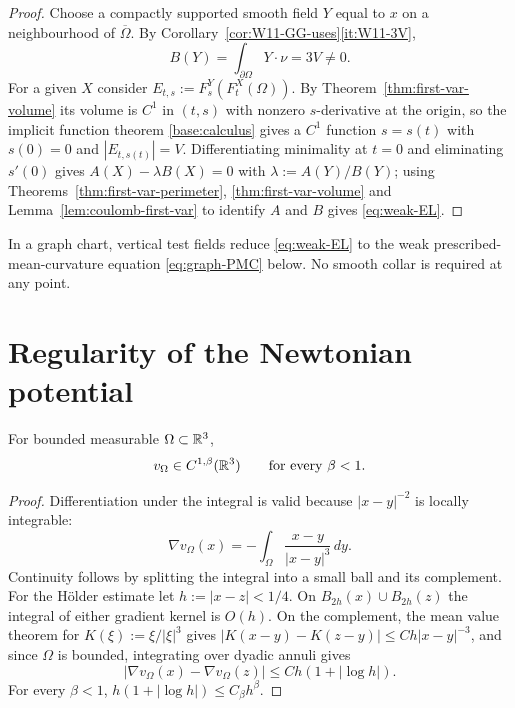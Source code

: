\begin{proof}
Choose a compactly supported smooth field $Y$ equal to $x$ on a neighbourhood
of $\overline\Omega$.  By
Corollary~\ref{cor:W11-GG-uses}\ref{it:W11-3V},
\begin{equation}\label{eq:BY}
  B(Y)=\int_{\partial\Omega}Y\cdot\nu=3V\ne0 .
\end{equation}
For a given $X$ consider $E_{t,s}:=F^Y_s(F^X_t(\Omega))$.  By
Theorem~\ref{thm:first-var-volume} its volume is $C^1$ in $(t,s)$ with nonzero
$s$-derivative at the origin, so the implicit function theorem
\ref{base:calculus} gives a $C^1$ function $s=s(t)$ with $s(0)=0$ and
$|E_{t,s(t)}|=V$.  Differentiating minimality at $t=0$ and eliminating
$s'(0)$ gives $A(X)-\lambda B(X)=0$ with $\lambda:=A(Y)/B(Y)$; using
Theorems~\ref{thm:first-var-perimeter}, \ref{thm:first-var-volume} and
Lemma~\ref{lem:coulomb-first-var} to identify $A$ and $B$ gives
\eqref{eq:weak-EL}.
\end{proof}

\begin{remark}\label{rem:no-collar}
In a graph chart, vertical test fields reduce \eqref{eq:weak-EL} to the weak
prescribed-mean-curvature equation \eqref{eq:graph-PMC} below.  No smooth
collar is required at any point.
\end{remark}

\section{Regularity of the Newtonian potential}

\begin{lemma}\label{lem:potential-C1beta}
For bounded measurable $\Omega\subset\mathbb R^3$,
\begin{equation}\label{eq:potential-C1beta}
  v_\Omega\in C^{1,\beta}(\mathbb R^3)\qquad\text{for every }\beta<1 .
\end{equation}
\end{lemma}

\begin{proof}
Differentiation under the integral is valid because $|x-y|^{-2}$ is locally
integrable:
\[
  \nabla v_\Omega(x)=-\int_\Omega\frac{x-y}{|x-y|^3}\,dy .
\]
Continuity follows by splitting the integral into a small ball and its
complement.  For the H\"older estimate let $h:=|x-z|<1/4$.  On
$B_{2h}(x)\cup B_{2h}(z)$ the integral of either gradient kernel is $O(h)$.
On the complement, the mean value theorem for $K(\xi):=\xi/|\xi|^3$ gives
$|K(x-y)-K(z-y)|\le Ch|x-y|^{-3}$, and since $\Omega$ is bounded, integrating
over dyadic annuli gives
\begin{equation}\label{eq:potential-log}
  |\nabla v_\Omega(x)-\nabla v_\Omega(z)|\le Ch(1+|\log h|).
\end{equation}
For every $\beta<1$, $h(1+|\log h|)\le C_\beta h^\beta$.
\end{proof}

